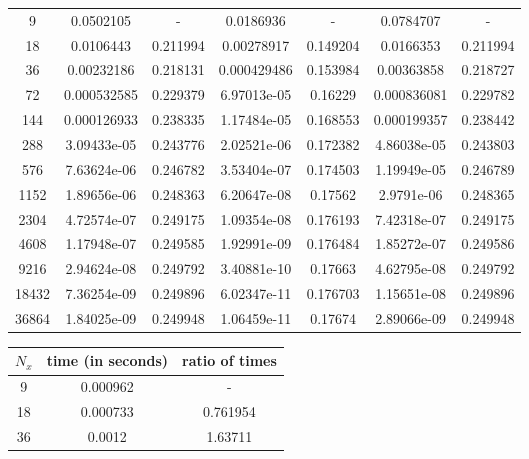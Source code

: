 \documentclass{article} %
\theoremstyle{plain}
\numberwithin{equation}{section} %
\numberwithin{figure}{section} %
\numberwithin{table}{section} %
\begin{document}
\begin{enumerate}[\ \ (a)]
\begin{table}[ht!]
\begin{tabular}{||c|c|c||c|c||c|c||}
            \hline
                 9 & 0.0502105   & -        & 0.0186936   & -        & 0.0784707   & -        \\
                18 & 0.0106443   & 0.211994 & 0.00278917  & 0.149204 & 0.0166353   & 0.211994 \\
                36 & 0.00232186  & 0.218131 & 0.000429486 & 0.153984 & 0.00363858  & 0.218727 \\
                72 & 0.000532585 & 0.229379 & 6.97013e-05 & 0.16229  & 0.000836081 & 0.229782 \\
               144 & 0.000126933 & 0.238335 & 1.17484e-05 & 0.168553 & 0.000199357 & 0.238442 \\
               288 & 3.09433e-05 & 0.243776 & 2.02521e-06 & 0.172382 & 4.86038e-05 & 0.243803 \\
               576 & 7.63624e-06 & 0.246782 & 3.53404e-07 & 0.174503 & 1.19949e-05 & 0.246789 \\
              1152 & 1.89656e-06 & 0.248363 & 6.20647e-08 & 0.17562  & 2.9791e-06  & 0.248365 \\
              2304 & 4.72574e-07 & 0.249175 & 1.09354e-08 & 0.176193 & 7.42318e-07 & 0.249175 \\
              4608 & 1.17948e-07 & 0.249585 & 1.92991e-09 & 0.176484 & 1.85272e-07 & 0.249586 \\
              9216 & 2.94624e-08 & 0.249792 & 3.40881e-10 & 0.17663  & 4.62795e-08 & 0.249792 \\
             18432 & 7.36254e-09 & 0.249896 & 6.02347e-11 & 0.176703 & 1.15651e-08 & 0.249896 \\
             36864 & 1.84025e-09 & 0.249948 & 1.06459e-11 & 0.17674  & 2.89066e-09 & 0.249948 \\
            \hline\hline
            \end{tabular}
        \end{table}
        \vspace{-0.25cm}
        \begin{table}[ht!]
            \centering
            \begin{tabular}{||c|c|c||}\hline\hline
               $N_x$ & time (in seconds) & ratio of times \\
            \hline
                 9 &            0.000962 &         -        \\
                18 &            0.000733 &         0.761954 \\
                36 &            0.0012   &         1.63711  \\

\end{tabular}
\end{table}
\end{enumerate}
\end{document}
